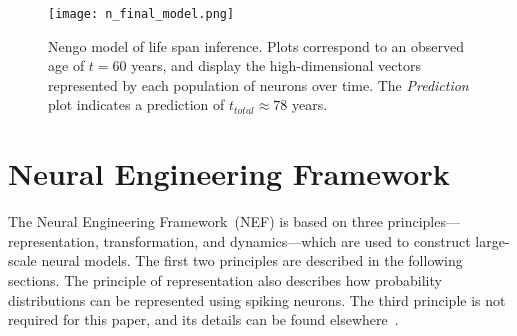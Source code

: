 \documentclass[10pt,letterpaper]{article}
\begin{document}
%
%

\begin{figure*}[h]
\begin{center}
\texttt{[image: n\_final\_model.png]}
\end{center}
\caption{Nengo model of life span inference. Plots correspond to an observed age of $t=60$ years, and display the high-dimensional vectors represented by each population of neurons over time. The \textit{Prediction} plot indicates a prediction of $t_{total} \approx 78$ years.}
\label{fig:final_model}
\end{figure*}

\section{Neural Engineering Framework}

The Neural Engineering Framework~(NEF) is based on three principles---representation, transformation, and dynamics---which are used to construct large-scale neural models. The first two principles are described in the following sections. The principle of representation also describes how probability distributions can be represented using spiking neurons. The third principle is not required for this paper, and its details can be found elsewhere~\cite{eliasmith2003neural}. 
\end{document}
